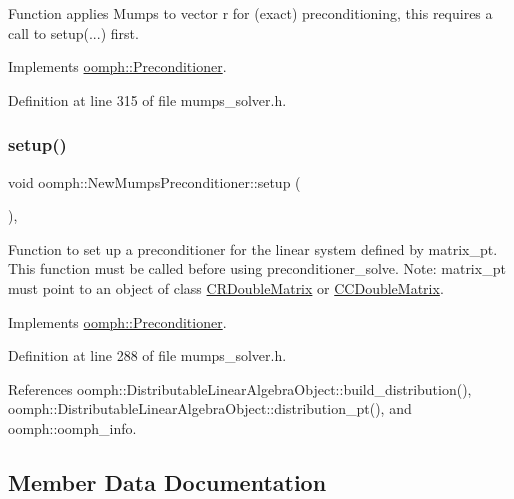 Function applies Mumps to vector r for (exact) preconditioning, this requires a call to setup(...) first. 



Implements \hyperlink{classoomph_1_1Preconditioner_ace1199369e4465cd2b9a34884bb64ec8}{oomph\+::\+Preconditioner}.



Definition at line 315 of file mumps\+\_\+solver.\+h.

\mbox{\label{classoomph_1_1NewMumpsPreconditioner_a47e894b47284711131cb0a13a65c24e5}} 
\subsubsection{\texorpdfstring{setup()}{setup()}}
{\footnotesize\ttfamily void oomph\+::\+New\+Mumps\+Preconditioner\+::setup (\begin{DoxyParamCaption}{ }\end{DoxyParamCaption})\hspace{0.3cm}{\ttfamily [inline]}, {\ttfamily [virtual]}}



Function to set up a preconditioner for the linear system defined by matrix\+\_\+pt. This function must be called before using preconditioner\+\_\+solve. Note\+: matrix\+\_\+pt must point to an object of class \hyperlink{classoomph_1_1CRDoubleMatrix}{C\+R\+Double\+Matrix} or \hyperlink{classoomph_1_1CCDoubleMatrix}{C\+C\+Double\+Matrix}. 



Implements \hyperlink{classoomph_1_1Preconditioner_af4886f4efe510e5c9b0eb19422943588}{oomph\+::\+Preconditioner}.



Definition at line 288 of file mumps\+\_\+solver.\+h.



References oomph\+::\+Distributable\+Linear\+Algebra\+Object\+::build\+\_\+distribution(), oomph\+::\+Distributable\+Linear\+Algebra\+Object\+::distribution\+\_\+pt(), and oomph\+::oomph\+\_\+info.



\subsection{Member Data Documentation}
\mbox{\label{classoomph_1_1NewMumpsPreconditioner_aa51fd330deb0d4b82a43c172caa9979b}} 
